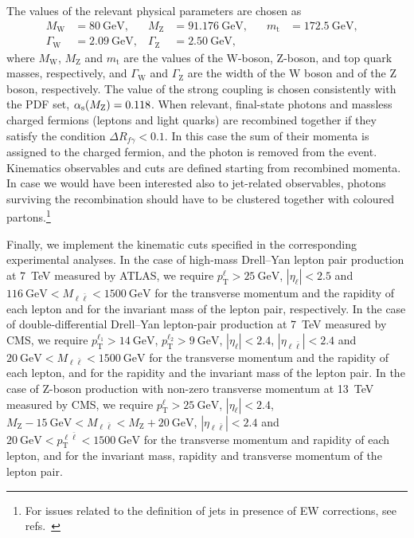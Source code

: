 The values of the relevant physical parameters are chosen as
\begin{equation}
\begin{aligned}
M_\mathrm{W} &= \SI{80}{\giga\electronvolt} \text{,} \quad &
M_\mathrm{Z} &= \SI{91.176}{\giga\electronvolt} \text{,} \quad &
m_\mathrm{t} &= \SI{172.5}{\giga\electronvolt} \text{,} \quad \\
\Gamma_\mathrm{W} &= \SI{2.09}{\giga\electronvolt} \text{,} &
\Gamma_\mathrm{Z} &= \SI{2.50}{\giga\electronvolt} \text{,}
\end{aligned}
\label{eq:parameters}
\end{equation}
where $M_\mathrm{W}$, $M_\mathrm{Z}$ and $m_\mathrm{t}$ are the values of the W-boson, Z-boson, and
top quark masses, respectively, and $\Gamma_\mathrm{W}$ and $\Gamma_\mathrm{Z}$ are the width of
the W boson and of the Z boson, respectively. The value of the strong
coupling is chosen consistently with the PDF set, $\alpha_\mathrm{s}(M_\mathrm{Z})=0.118$.
When relevant, final-state photons and massless charged fermions (leptons and light quarks) are recombined together 
if they satisfy the condition $\Delta R_{f \gamma} < 0.1$. In this case the
sum of their momenta is assigned to the charged fermion, and the photon is removed
from the event. Kinematics observables and cuts are defined starting from recombined momenta. In 
case we would have been interested also to jet-related observables,
photons surviving the recombination should have to be clustered together with coloured
partons.\footnote{For issues related to the definition of jets in presence of EW corrections,
    see refs.~\cite{Frederix:2016ost,Denner:2019zfp}} 
    
Finally, we implement the kinematic cuts specified in the corresponding
experimental analyses. In the case of high-mass Drell--Yan lepton pair
production at \SI{7}{\tera\electronvolt} measured by ATLAS, we require $p_\mathrm{T}^\ell>\SI{25}{\giga\electronvolt}$,
$|\eta_\ell|<2.5$ and $\SI{116}{\giga\electronvolt}<M_{\ell\bar\ell}<\SI{1500}{\giga\electronvolt}$ for the transverse
momentum and the rapidity of each lepton and for the invariant mass of the
lepton pair, respectively. In the case of double-differential Drell--Yan
lepton-pair production
at \SI{7}{\tera\electronvolt} measured by CMS, we require $p_\mathrm{T}^{\ell_1}>\SI{14}{\giga\electronvolt}$, $p_\mathrm{T}^{\ell_2}>\SI{9}{\giga\electronvolt}$,
$|\eta_\ell|<2.4$, $|\eta_{\ell\bar\ell}|<2.4$ and $\SI{20}{\giga\electronvolt}<M_{\ell\bar\ell}<\SI{1500}{\giga\electronvolt}$
for the transverse momentum and the rapidity of each lepton, and for the
rapidity and the invariant mass of the lepton pair. In the case of Z-boson
production with non-zero transverse momentum at \SI{13}{\tera\electronvolt} measured by CMS, we
require $p_\mathrm{T}^\ell>\SI{25}{\giga\electronvolt}$, $|\eta_\ell|<2.4$,
$M_\mathrm{Z}-\SI{15}{\giga\electronvolt}<M_{\ell\bar\ell}<M_\mathrm{Z}+\SI{20}{\giga\electronvolt}$,
$|\eta_{\ell\bar\ell}|<2.4$ and $\SI{20}{\giga\electronvolt}<p_\mathrm{T}^{\ell\bar\ell}<\SI{1500}{\giga\electronvolt}$ for the
transverse momentum and rapidity of each lepton, and for the invariant mass,
rapidity and transverse momentum of the lepton pair.

